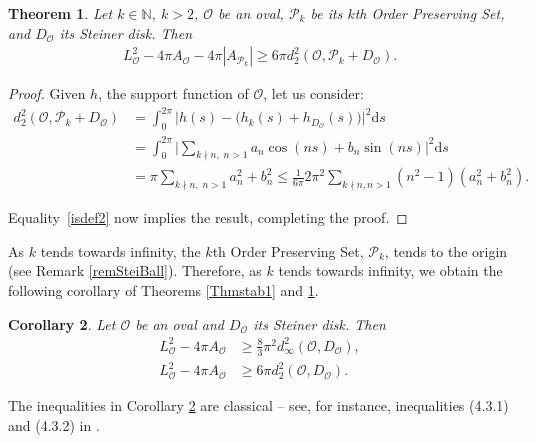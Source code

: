 \documentclass{amsart}
\newtheorem{thm}{Theorem}[section]
\newtheorem{cor}[thm]{Corollary}
\theoremstyle{definition}
\numberwithin{equation}{section}
\renewcommand{\d}{\mathrm{d}}
\begin{document}
\begin{thm}\label{Thmstab2}
Let $k\in \mathbb{N},\ k>2$, $\mathcal{O}$ be an oval, $\mathcal{P}_k$ be its $k$th Order Preserving Set, and $D_{\mathcal{O}}$ its Steiner disk. Then
\begin{align*}
     L_{\mathcal{O}}^2 - 4\pi A_{\mathcal{O}}-4\pi |A_{\mathcal{P}_k}|\geqslant 6\pi d^2_2(\mathcal{O},\mathcal{P}_k+ D_{\mathcal{O}}).
\end{align*}
\end{thm}
\begin{proof}
     Given $h$, the support function of $\mathcal{O}$, let us consider:
     \begin{align*}       
     d^2_2(\mathcal{O},\mathcal{P}_k+ D_{\mathcal{O}})&=\int_0^{2\pi}\Big|h(s)-\Big(h_k(s) + h_{D_{\mathcal{O}}}(s)\Big)\Big|^2\d s\\ &=
     \int_0^{2\pi}\Big|\sum_{k \nmid n,\; n>1}a_n\cos(ns)+b_n\sin(ns)\Big|^2\d s \\
     &= \pi\sum_{k \nmid n,\; n>1}a_n^2+b_n^2 \leqslant \frac{1}{6\pi}2\pi^2\sum_{k \nmid n, n>1 }(n^2-1)(a_n^2+b_n^2).
\end{align*}

Equality~\eqref{isdef2} now implies the result, completing the proof.
\end{proof}

As $k$ tends towards infinity, the $k$th Order Preserving Set, $\mathcal{P}_k$, tends to the origin (see Remark \ref{remSteiBall}). Therefore, as $k$ tends towards infinity, we obtain the following corollary of Theorems \ref{Thmstab1} and \ref{Thmstab2}.

\begin{cor}\label{cor:stability}
    Let $\mathcal{O}$ be an oval and $D_{\mathcal{O}}$ its Steiner disk. Then
\begin{align*}
     L_{\mathcal{O}}^2 - 4\pi A_{\mathcal{O}} &\geqslant\frac{8}{3}\pi^2d^2_\infty(\mathcal{O},D_{\mathcal{O}}),\\ 
     L_{\mathcal{O}}^2 - 4\pi A_{\mathcal{O}}&\geqslant 6\pi d^2_2(\mathcal{O},D_{\mathcal{O}}).
\end{align*}
\end{cor}

The inequalities in Corollary \ref{cor:stability} are classical -- see, for instance, inequalities (4.3.1) and (4.3.2) in \cite{G4}.
\end{document}
